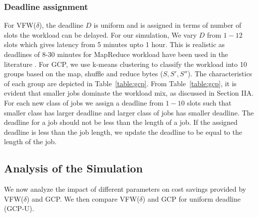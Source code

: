 \documentclass[10pt,conference,compsocconf,letterpaper]{IEEEtran}
\begin{document}
\subsubsection*{Deadline assignment}
For VFW($\delta$), the deadline $D$ is uniform and is assigned in terms of number of slots the workload can be delayed. For our simulation, We vary $D$ from $1-12$ slots which gives latency from 5 minutes upto 1 hour. This is realistic as deadlines of 8-30 minutes for MapReduce workload have been used in the literature \cite{n10,n11}. For GCP, we use k-means clustering to classify the workload into 10 groups based on the map, shuffle and reduce bytes ($S, S', S''$). The characteristics of each group are depicted in Table~\ref{table:gcp}. From Table~\ref{table:gcp}, it is evident that smaller jobs dominate the workload mix, as discussed in Section IIA. For each new class of jobs we assign a deadline from $1-10$ slots such that smaller class has larger deadline and larger class of jobs has smaller deadline. The deadline for a job should not be less than the length of a job. If the assigned deadline is less than the job length, we update the deadline to be equal to the length of the job.





































\subsection{Analysis of the Simulation}
We now analyze the impact of different parameters on cost savings provided by VFW($\delta$) and GCP. We then compare VFW($\delta$) and GCP for uniform deadline (GCP-U).
\end{document}
